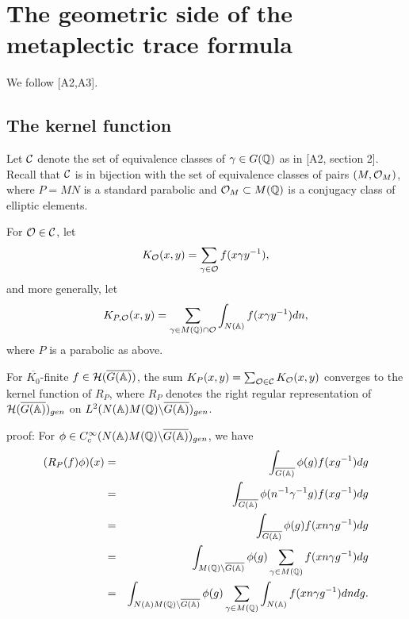 \section{The geometric side of the metaplectic trace formula}

We follow [A2,A3].

\subsection{The kernel function}

Let ${\cal{C}}$ denote the set of equivalence classes of
$\gamma \in G({\Bbb{Q}})$ as in [A2, section 2].
Recall that ${\cal{C}}$ is in bijection
with the set of equivalence classes of pairs $(M,{\cal{O}}_M)$,
where $P=MN $ is a standard parabolic and
${\cal{O}}_M\subset M({\Bbb{Q}})$ is a
conjugacy class of elliptic elements.

For ${\cal{O}}\in {\cal{C}}$, let 
\[
K_{{\cal{O}}}(x,y)=\sum_{\gamma \in {\cal{O}}}f(x\gamma y^{-1}),
\]
and more generally, let 
\begin{equation}
K_{P,{\cal{O}}}(x,y)=\sum_{\gamma \in M({\Bbb{Q}})\cap {\cal{O}}}
\int_{N({\Bbb{A}})}f(x\gamma y^{-1})dn,
\end{equation}
where $P$ is a parabolic as above.

\begin{lemma}
For $\overline{K_0}$-finite
$f\in {\cal{H}}(\overline{G({\Bbb{A}})})$, the sum
$K_P(x,y)=\sum_{{\cal{O}}\in {\cal{C}}}K_{{\cal{O}}}(x,y)$
converges to the kernel
function of $R_P$, where $R_P$ denotes the right
regular representation of
${\cal{H}}(\overline{G({\Bbb{A}})})_{gen}$ on
$L^2(N({\Bbb{A}})M({\Bbb{Q}})\backslash \overline{G({\Bbb{A}})})_{gen}$.
\end{lemma}

proof: For
$\phi \in C_c^\infty (N({\Bbb{A}})M({\Bbb{Q}})
\backslash \overline{G({\Bbb{A}})})_{gen}$, we have 
\begin{eqnarray*}
(R_P(f)\phi )(x) &=&\int_{\overline{G({\Bbb{A}})}}\phi (g)f(xg^{-1})dg \\
&=&\int_{\overline{G({\Bbb{A}})}}\phi (n^{-1}\gamma ^{-1}g)f(xg^{-1})dg \\
&=&\int_{\overline{G({\Bbb{A}})}}\phi (g)f(xn\gamma g^{-1})dg \\
&=&\int_{M({\Bbb{Q}})\backslash \overline{G({\Bbb{A}})}}\phi (g)\sum_{\gamma \in
M({\Bbb{Q}})}f(xn\gamma g^{-1})dg \\
&=&\int_{N({\Bbb{A}})M({\Bbb{Q}})\backslash \overline{G({\Bbb{A}})}}\phi
(g)\sum_{\gamma \in M({\Bbb{Q}})}\int_{N({\Bbb{A}})}f(xn\gamma g^{-1})dndg.
\end{eqnarray*}


